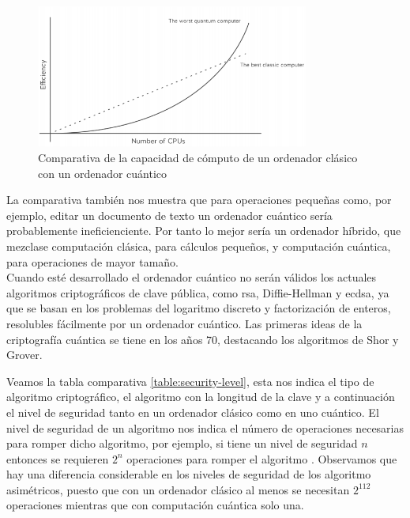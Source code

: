 \begin{figure}[h]
	\centering
	\includegraphics[width=0.8\textwidth]{figuras/comp_clasica_cuantica.png}
	\caption{Comparativa de la capacidad de cómputo de un ordenador clásico con un ordenador cuántico\cite{clasica-vs-cuantica}}
	\label{fig:comp-clasica-cuantica}
\end{figure}

La comparativa también nos muestra que para operaciones pequeñas como, por ejemplo, editar un documento de texto un ordenador cuántico sería probablemente ineficienciente. Por tanto lo mejor sería un ordenador híbrido, que mezclase computación clásica, para cálculos pequeños, y computación cuántica, para operaciones de mayor tamaño.\\

Cuando esté desarrollado el ordenador cuántico no serán válidos los actuales algoritmos criptográficos de clave pública, como \acrshort{rsa}, Diffie-Hellman y \mbox{\acrshort{ecdsa}}, ya que se basan en los problemas del logaritmo discreto y factorización de enteros, resolubles fácilmente por un ordenador cuántico. Las primeras ideas de la criptografía cuántica se tiene en los años 70, destacando los algoritmos de Shor y Grover.

Veamos la tabla comparativa \ref{table:security-level}, esta nos indica el tipo de algoritmo criptográfico, el algoritmo con la longitud de la clave y a continuación el nivel de seguridad tanto en un ordenador clásico como en uno cuántico. El nivel de seguridad de un algoritmo nos indica el número de operaciones necesarias para romper dicho algoritmo, por ejemplo, si tiene un nivel de seguridad $n$ entonces se requieren $2^n$ operaciones para romper el algoritmo \cite{security-level}. Observamos que hay una diferencia considerable en los niveles de seguridad de los algoritmo asimétricos, puesto que con un ordenador clásico al menos se necesitan $2^{112}$ operaciones mientras que con computación cuántica solo una. \\

